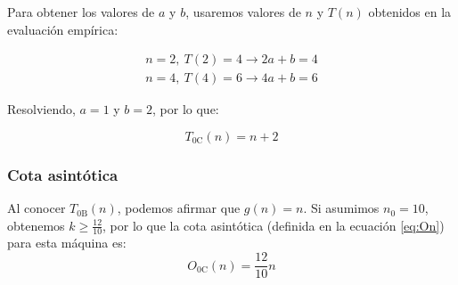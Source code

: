 Para obtener los valores de $a$ y $b$, usaremos valores de $n$ y $T(n)$ obtenidos en la evaluación empírica:

\begin{subequations}
    \begin{gather*}
        n = 2,\ T(2) = 4 \rightarrow 2a + b = 4 \\
        n = 4,\ T(4) = 6 \rightarrow 4a + b = 6
    \end{gather*}
\end{subequations}

Resolviendo, $a = 1$ y $b=2$, por lo que:

\begin{equation}
    T_{\mathrm{0C}}(n) = n + 2
\end{equation}


\subsubsection*{Cota asintótica}
Al conocer $T_{\mathrm{0B}}(n)$, podemos afirmar que $g(n) = n$. Si asumimos $n_0 = 10$, obtenemos $k \geq \frac{12}{10}$, por lo que la cota asintótica (definida en la ecuación \ref{eq:On}) para esta máquina es:
\begin{equation}
    O_{\mathrm{0C}}(n) = \frac{12}{10} n
\end{equation}

